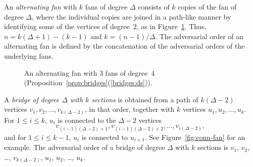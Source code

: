 An \emph{alternating fan} with $k$ fans of degree $\Delta$
consists of $k$ copies of the fan of degree $\Delta$,
where the individual copies are joined in a path-like manner by
identifying some of the vertices of degree~$2$, as in
Figure~\ref{fig:alt-fan}. 
Thus, $n=k(\Delta+1)-(k-1)$ and $k=(n-1)/\Delta$.
The adversarial 
order of an alternating fan is defined by the concatenation of
the adversarial orders of the underlying fans.

\begin{figure}[!htb]
\begin{center}
\caption{An alternating fan with $3$ fans of degree~$4$ (Proposition~\ref{prop:bridges}(\ref{bridges:ds})).}
\label{fig:alt-fan}
\end{center}
\end{figure}

A \emph{bridge of degree $\Delta$ with $k$ sections} is
obtained from a path of $k(\Delta-2)$ vertices $v_1, v_2, \ldots,
v_{k(\Delta-2)}$, in that order, together with $k$ vertices $u_1, u_2, \ldots,
u_k$.
For $1 \leq i \leq k$, $u_i$ is connected to the $\Delta-2$ vertices
$$v_{(i-1)(\Delta-2)+1}, v_{(i-1)(\Delta-2)+2},\ldots, v_{i(\Delta-2)},$$ and
for $1 \leq i \leq k-1$, $u_i$ is connected to $u_{i+1}$.
See Figure~\ref{fig:conn-fan} for an example.
The adversarial order of a bridge of degree $\Delta$ with $k$ sections
is $v_1$, $v_2$, \ldots, $v_{k(\Delta-2)}$, $u_1$, $u_2$, \ldots, $u_k$. 

